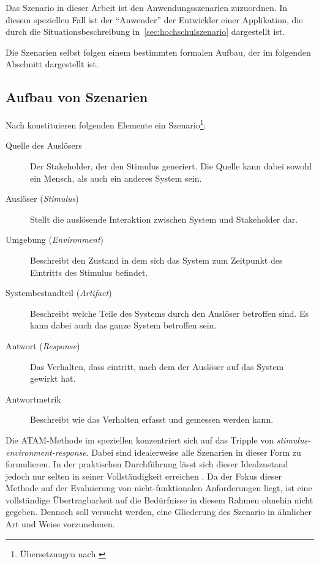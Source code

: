   Das Szenario in dieser Arbeit ist den Anwendungsszenarien zuzuordnen. In diesem speziellen Fall ist der "`Anwender"' der Entwickler einer Applikation, die durch die Situationsbeschreibung in~\ref{sec:hochschulszenario} dargestellt ist.
  
  Die Szenarien selbst folgen einem bestimmten formalen Aufbau, der im folgenden Abschnitt dargestellt ist.


\subsection{Aufbau von Szenarien} %
\label{sub:aufbau_von_szenarien}

  Nach \citep[S. 75]{software_architecture_in_practice} konstituieren folgenden Elemente ein Szenario\footnote{Übersetzungen nach \citep[S. 63]{effektive_software_architekturen}}:
  
  \begin{description}
    \item[Quelle des Auslösers] Der Stakeholder, der den Stimulus generiert. Die Quelle kann dabei sowohl ein Mensch, als auch ein anderes System sein.
    \item[Auslöser (\emph{Stimulus})] Stellt die auslösende Interaktion zwischen System und Stakeholder dar.
    \item[Umgebung (\emph{Environment})] Beschreibt den Zustand in dem sich das System zum Zeitpunkt des Eintritts des Stimulus befindet.
    \item[Systembestandteil (\emph{Artifact})] Beschreibt welche Teile des Systems durch den Auslöser betroffen sind. Es kann dabei auch das ganze System betroffen sein.
    \item[Antwort (\emph{Response})] Das Verhalten, dass eintritt, nach dem der Auslöser auf das System gewirkt hat.
    \item[Antwortmetrik] Beschreibt wie das Verhalten erfasst und gemessen werden kann.
  \end{description}
  
  Die ATAM-Methode im speziellen konzentriert sich auf das Tripple von \emph{stimulus-environ\-ment-response}. Dabei sind idealerweise alle Szenarien in dieser Form zu formulieren. In der praktischen Durchführung lässt sich dieser Idealzustand jedoch nur selten in seiner Vollständigkeit erreichen \citep[S. 53]{evaluating_software_architectures}. Da der Fokus dieser Methode auf der Evaluierung von nicht-funktionalen Anforderungen liegt, ist eine vollständige Übertragbarkeit auf die Bedürfnisse in diesem Rahmen ohnehin nicht gegeben. Dennoch soll versucht werden, eine Gliederung des Szenario in ähnlicher Art und Weise vorzunehmen.

